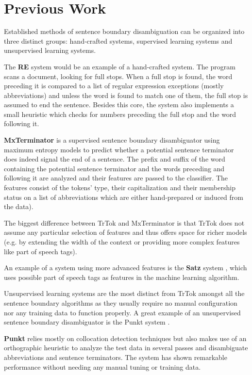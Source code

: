 \section{Previous Work}
\label{sec:previous-work}

Established methods of sentence boundary disambiguation can be
organized into three distinct groups: hand-crafted systems, supervised
learning systems and unsupervised learning systems.

The \textbf{RE} system \cite{sbd-re} would be an example of a
hand-crafted system. The program scans a document, looking for full
stops. When a full stop is found, the word preceding it is compared to
a list of regular expression exceptions (mostly abbreviations) and
unless the word is found to match one of them, the full stop is
assumed to end the sentence. Besides this core, the system also
implements a small heuristic which checks for numbers preceding the
full stop and the word following it.

\textbf{MxTerminator} \cite{sbd-mxterm} is a supervised sentence
boundary disambiguator using maximum entropy models to predict whether
a potential sentence terminator does indeed signal the end of a
sentence. The prefix and suffix of the word containing the potential
sentence terminator and the words preceding and following it are
analyzed and their features are passed to the classifier. The features
consist of the tokens' type, their capitalization and their membership
status on a list of abbreviations which are either hand-prepared or
induced from the data).

The biggest difference between TrTok and MxTerminator is that TrTok
does not assume any particular selection of features and thus offers
space for richer models (e.g. by extending the width of the context or
providing more complex features like part of speech tags).

An example of a system using more advanced features is the
\textbf{Satz} system \cite{sbd-satz}, which uses possible part of
speech tags as features in the machine learning algorithm.

Unsupervised learning systems are the most distinct from TrTok amongst
all the sentence boundary algorithms as they usually require no manual
configuration nor any training data to function properly. A great
example of an unsupervised sentence boundary disambiguator is the
Punkt system \cite{sbd-punkt}.

\textbf{Punkt} relies mostly on collocation detection techniques but
also makes use of an orthographic heuristic to analyze the test data
in several passes and disambiguate abbreviations and sentence
terminators. The system has shown remarkable performance without
needing any manual tuning or training data.
